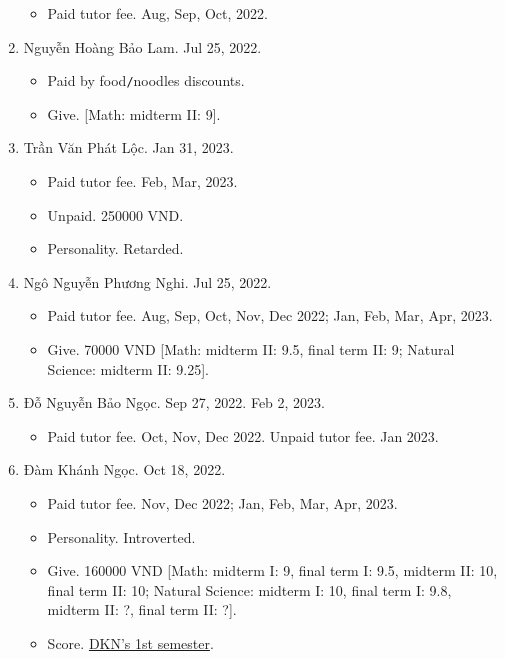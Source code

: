 \documentclass{article}
\begin{document}
\begin{enumerate}
\begin{itemize}
		\item {\sf Paid tutor fee.} Aug, Sep, Oct, 2022.
	\end{itemize}
	\item {\sc Nguyễn Hoàng Bảo Lam.} {\sf[In]} Jul 25, 2022.
	\begin{itemize}
		\item {\sf Paid by food\texttt{/}noodles discounts.}
		\item {\sf Give.} [Math: midterm II: 9].
	\end{itemize}
	\item {\sc Trần Văn Phát Lộc.} {\sf[In]} Jan 31, 2023.  {\sf[Out]}
	\begin{itemize}
		\item {\sf Paid tutor fee.} Feb, Mar, 2023.
		\item {\sf Unpaid.} 250000 VND.
		\item {\sf Personality.} Retarded.
	\end{itemize}
	\item {\sc Ngô Nguyễn Phương Nghi.} {\sf[In]} Jul 25, 2022.
	\begin{itemize}
		\item {\sf Paid tutor fee.} Aug, Sep, Oct, Nov, Dec 2022; Jan, Feb, Mar, Apr, 2023.
		\item {\sf Give.} 70000 VND [Math: midterm II: 9.5, final term II: 9; Natural Science: midterm II: 9.25].
	\end{itemize}
	\item {\sc Đỗ Nguyễn Bảo Ngọc.} {\sf[In]} Sep 27, 2022. {\sf[Out]} Feb 2, 2023.
	\begin{itemize}
		\item {\sf Paid tutor fee.} Oct, Nov, Dec 2022. {\sf Unpaid tutor fee.} Jan 2023.
	\end{itemize}
	\item {\sc Đàm Khánh Ngọc.} {\sf[In]} Oct 18, 2022.
	\begin{itemize}
		\item {\sf Paid tutor fee.} Nov, Dec 2022; Jan, Feb, Mar, Apr, 2023.
		\item {\sf Personality.} Introverted.
		\item {\sf Give.} 160000 VND [Math: midterm I: 9, final term I: 9.5, midterm II: 10, final term II: 10; Natural Science: midterm I: 10, final term I: 9.8, midterm II: ?, final term II: ?].
		\item {\sf Score.} \href{https://github.com/NQBH/hobby/blob/master/STEM/student/Dam_Khanh_Ngoc_grade_6_1st_semester.jpg}{DKN's 1st semester}.
	\end{itemize}

\end{enumerate}
\end{document}
